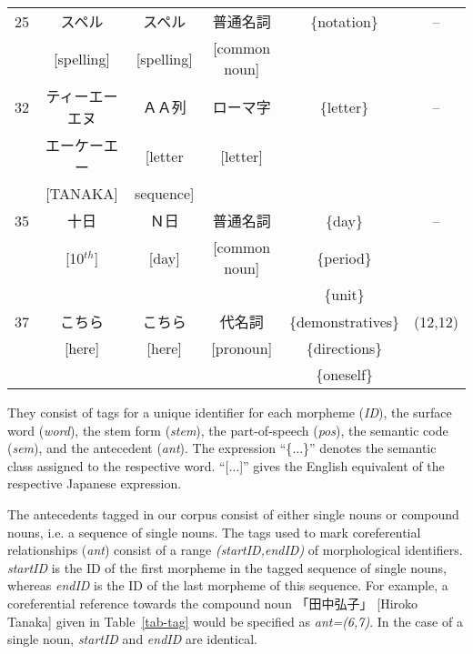 \begin{table}[hbt]
\begin{center}
\begin{scriptsize}
\begin{tabular}{|r|c|c|c|c|c|}
      25 & スペル       & スペル        & 普通名詞      &  \{notation\}        & --    \\ [-0.5em]
         & [spelling]   & [spelling]    & [common noun] &                      &       \\ \hline
      32 & ティーエーエヌ  & ＡＡ列     & ローマ字      &  \{letter\}          & --    \\ [-0.5em]
         & エーケーエー    & [letter    & [letter]      &                      &       \\ [-0.5em]
         & [TANAKA]     & sequence]     &          &                      &       \\ \hline
      35 & 十日         & Ｎ日          & 普通名詞      &  \{day\}             & --    \\ [-0.5em]
         & [10${}^{th}$]& [day]         & [common noun] &  \{period\}          &       \\ [-0.5em]
         &              &               &               &  \{unit\}            &       \\ \hline
      37 & こちら       & こちら        & 代名詞        &  \{demonstratives\}  & (12,12) \\ [-0.5em]
         & [here]       & [here]        & [pronoun]     &  \{directions\}      &       \\ [-0.5em]
         &              &               &               &  \{oneself\}         &       \\ \hline
     \end{tabular}
   \end{scriptsize}
   \end{center}
   \vspace*{-1\baselineskip}
\end{table}

They consist of tags for a unique identifier for each morpheme ({\em ID}), the surface word ({\em word}),
the stem form ({\em stem}), the part-of-speech ({\em pos}), the semantic code ({\em sem}),
and the antecedent ({\em ant}).
The expression ``\{$\ldots$\}'' denotes the semantic class assigned to the respective word.
``[$\ldots$]'' gives the English equivalent of the respective Japanese expression.

The antecedents tagged in our corpus consist of either single nouns or compound nouns, i.e. a 
sequence of single nouns. The tags used to mark coreferential relationships ({\em ant}) consist
of a range {\em (startID,endID)} of morphological identifiers. {\em startID} is the ID of the
first morpheme in the tagged sequence of single nouns, whereas {\em endID} is the ID of the
last morpheme of this sequence. For example, a coreferential reference towards the compound noun
「田中弘子」 [Hiroko Tanaka] given in Table~\ref{tab-tag} would be specified as {\em ant=(6,7)}.
In the case of a single noun, {\em startID} and {\em endID} are identical.

